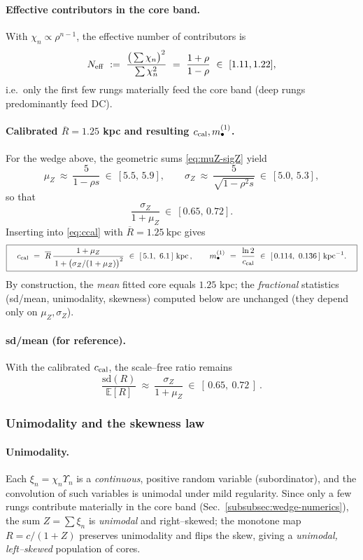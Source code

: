 \documentclass[10pt]{article}
\theoremstyle{definition}
\theoremstyle{plain}
\begin{document}
\paragraph{Effective contributors in the core band.}\label{par:uom-main-188}
With $\chi_n\propto\rho^{n-1}$, the effective number of contributors is
\[
N_{\rm eff}\ :=\ \frac{\big(\sum \chi_n\big)^2}{\sum \chi_n^2}\ =\ \frac{1+\rho}{1-\rho}\ \in\ [1.11,1.22],
\]
i.e.\ only the first few rungs materially feed the core band (deep rungs predominantly feed DC).

\paragraph{Calibrated $\overline{R}=1.25$ kpc and resulting $c_{\rm cal},m_\bullet^{(1)}$.}\label{par:uom-main-189}
For the wedge above, the geometric sums \eqref{eq:muZ-sigZ} yield
\[
\mu_Z\ \approx\ \frac{5}{1-\rho s}\ \in\ [5.5,\,5.9],\qquad 
\sigma_Z\ \approx\ \frac{5}{\sqrt{1-\rho^2 s}}\ \in\ [5.0,\,5.3],
\]
so that
\[
\frac{\sigma_Z}{1+\mu_Z}\ \in\ [0.65,\,0.72].
\]
Inserting into \eqref{eq:ccal} with $\overline{R}=1.25~\mathrm{kpc}$ gives
\[
\boxed{\quad
c_{\rm cal}\ =\ \overline{R}\,\frac{1+\mu_Z}{\,1+\bigl(\sigma_Z/(1+\mu_Z)\bigr)^2}
\ \in\ [\,5.1,\ 6.1\,]\ \mathrm{kpc}\,,
\qquad
m_\bullet^{(1)}\ =\ \frac{\ln 2}{c_{\rm cal}}\ \in\ [\,0.114,\ 0.136\,]\ \mathrm{kpc}^{-1}.
\quad}
\]
By construction, the \emph{mean} fitted core equals $1.25$ kpc; the \emph{fractional} statistics (sd/mean, unimodality, skewness) computed below are unchanged (they depend only on $\mu_Z,\sigma_Z$).

\paragraph{sd/mean (for reference).}\label{par:uom-main-190}
With the calibrated $c_{\rm cal}$, the scale–free ratio remains
\[
\boxed{\ \frac{\mathrm{sd}(R)}{\mathbb E[R]}\ \approx\ \frac{\sigma_Z}{1+\mu_Z}\ \in\ [\,0.65,\ 0.72\,]\ .\ }
\]

\subsubsection*{Unimodality and the skewness law}
\label{subsubsec:unimodality-skew}

\paragraph{Unimodality.}\label{par:uom-main-191}
Each $\xi_n=\chi_n\Upsilon_n$ is a \emph{continuous}, positive random variable (subordinator), and the convolution of such variables is unimodal under mild regularity. Since only a few rungs contribute materially in the core band (Sec.~\ref{subsubsec:wedge-numerics}), the sum $Z=\sum \xi_n$ is \emph{unimodal} and right–skewed; the monotone map $R=c/(1+Z)$ preserves unimodality and flips the skew, giving a \emph{unimodal, left–skewed} population of cores.
\end{document}

